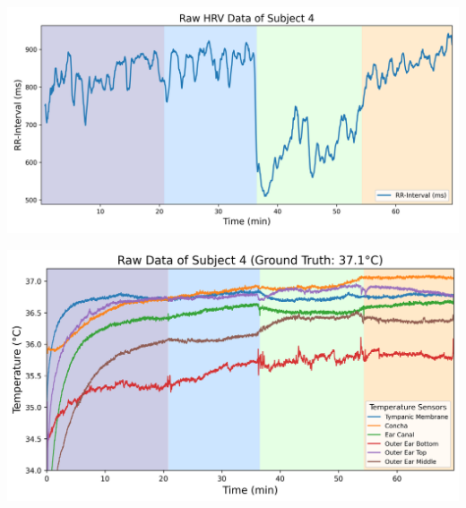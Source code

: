 \documentclass[en]{sdqbeamer}
\begin{document}
\begin{frame}
    \begin{center}
        \includegraphics[width=0.9\linewidth]{../thesis-doc/images/study2/p04/raw_hrv_data_participant_4.png} 
    \end{center}
\end{frame}

\begin{frame}
    \begin{center}
        \includegraphics[width=0.9\linewidth]{../thesis-doc/images/study2/p04/Logging_study2_p04_0smoothed_raw_data.png} 
    \end{center}
\end{frame}


\end{document}
